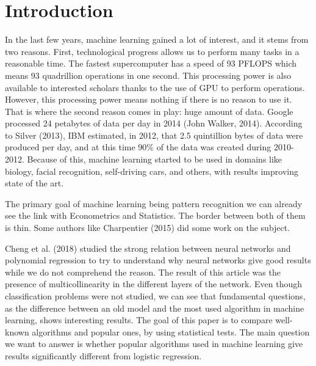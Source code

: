 \documentclass[a4paper,12pt]{article}
\numberwithin{equation}{section}
\begin{document}
\newpage






\tableofcontents
\newpage

\onehalfspacing
\setlength{\parskip}{1em}
\section{Introduction}


In the last few years, machine learning gained a lot of interest, and it stems from two reasons. First, technological progress allows us to perform many tasks in a reasonable time. The fastest supercomputer has a speed of 93 PFLOPS which means $93$ quadrillion operations in one second. This processing power is also available to interested scholars thanks to the use of GPU to perform operations. However, this processing power means nothing if there is no reason to use it. That is where the second reason comes in play: huge amount of data. Google processed 24 petabytes of data per day in 2014 (John Walker, 2014). According to Silver (2013), IBM estimated, in 2012, that 2.5 quintillion bytes of data were produced per day, and at this time 90\% of the data was created during 2010-2012. Because of this, machine learning started to be used in domains like biology, facial recognition, self-driving cars, and others, with results improving state of the art. \par 
The primary goal of machine learning being pattern recognition we can already see the link with Econometrics and Statistics. The border between both of them is thin. Some authors like Charpentier (2015) did some work on the subject.\par 

Cheng et al. (2018) studied the strong relation between neural networks and polynomial regression to try to understand why neural networks give good results while we do not comprehend the reason. The result of this article was the presence of multicollinearity in the different layers of the network. Even though classification problems were not studied, we can see that fundamental questions, as the difference between an old model and the most used algorithm in machine learning, shows interesting results. The goal of this paper is to compare well-known algorithms and popular ones, by using statistical tests. The main question we want to answer is whether popular algorithms used in machine learning give results significantly different from logistic regression. \par
\end{document}
